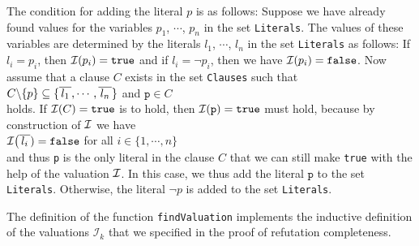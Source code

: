 \begin{enumerate}
      The condition for adding the literal $p$ is as follows:
      Suppose we have already found values for the variables
      $p_1$, $\cdots$, $p_n$ in the set \texttt{Literals}.
      The values of these variables are determined by the literals $l_1$, $\cdots$, $l_n$ in the set \texttt{Literals}
      as follows: If $l_i = p_i$, then $\mathcal{I}(p_i) = \texttt{true}$
      and if $l_i = \neg p_i$, then we have $\mathcal{I}(p_i) = \texttt{false}$.
      Now assume that a clause $C$ exists in the set \texttt{Clauses} such that
      \\[0.2cm]
      \hspace*{1.3cm}
      $C \backslash \{p\} \subseteq \{ \overline{\,l_1\,}, \cdots, \overline{\,l_n\,} \}$ \quad and \quad $\texttt{p} \in C$
      \\[0.2cm]
      holds. If $\mathcal{I}(C) = \texttt{true}$ is to hold, then $\mathcal{I}(\texttt{p}) = \texttt{true}$ must hold, because
      by construction of $\mathcal{I}$ we have
      \\[0.2cm]
      \hspace*{1.3cm}
      $\mathcal{I}\bigl(\overline{\,l_i\,}) = \texttt{false}$ \quad for all $i \in \{1,\cdots,n\}$
      \\[0.2cm]
      and thus \texttt{p} is the only literal in the clause $C$ that we can still make \texttt{true} with the help of the valuation $\mathcal{I}$. In this case, we thus add the literal
      $\texttt{p}$ to the set \texttt{Literals}. Otherwise, the literal $\neg p$ is added to the set
      \texttt{Literals}.
\end{enumerate}
The definition of the function \texttt{findValuation} implements the inductive definition of the valuations
$\mathcal{I}_k$ that we specified in the proof of refutation completeness.




